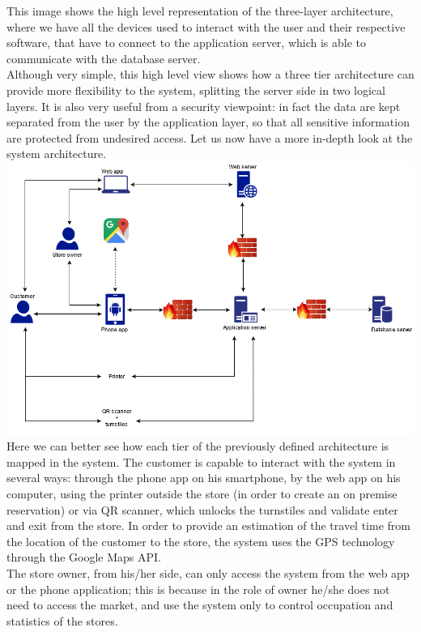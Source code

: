 This image shows the high level representation of the three-layer architecture, where we have all the devices used to interact with the user and their respective software, that have to connect to the application server, which is able to communicate with the database server.\\
Although very simple, this high level view shows how a three tier architecture can provide more flexibility to the system, splitting the server side in two logical layers. It is also very useful from a security viewpoint: in fact the data are kept separated from the user by the application layer, so that all sensitive information are protected from undesired access.
\newpage
Let us now have a more in-depth look at the system architecture.\\
\includegraphics[scale=0.5]{Images/System Architecture.png}\\
Here we can better see how each tier of the previously defined architecture is mapped in the system. The customer is capable to interact with the system in several ways: through the phone app on his smartphone, by the web app on his computer, using the printer outside the store (in order to create an on premise reservation) or via QR scanner, which unlocks the turnstiles and validate enter and exit from the store. In order to provide an estimation of the travel time from the location of the customer to the store, the system uses the GPS technology through the Google Maps API.\\
The store owner, from his/her side, can only access the system from the web app or the phone application; this is because in the role of owner he/she does not need to access the market, and use the system only to control occupation and statistics of the stores.\\
